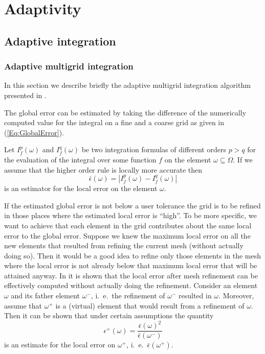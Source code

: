 \documentclass[11pt,a4paper,headinclude,footinclude,DIV16,headings=normal]{scrreprt}
\begin{document}
\chapter{Adaptivity}

\section{Adaptive integration}

\subsection{Adaptive multigrid integration}

In this section we describe briefly the adaptive multigrid integration
algorithm presented in \cite{Deuflhard93}.


The global error can be estimated by taking the difference of the numerically
computed value for the integral on a fine and a coarse grid as given in
(\ref{Eq:GlobalError}).


Let $I_f^p(\omega)$ and $I_f^q(\omega)$ be two integration formulas of
different orders $p>q$ for the evaluation of the integral over some
function $f$ on the element $\omega\subseteq\Omega$. If we assume that
the higher order rule is locally more accurate then
\begin{equation}
\bar{\epsilon}(\omega) = |I_f^p(\omega)-I_f^q(\omega)|
\end{equation}
is an estimator for the local error on the element $\omega$.


If the estimated global error is not below a user tolerance the grid
is to be refined in those places where the estimated local error is
``high''. To be more specific, we want to achieve that each element in
the grid contributes about the same local error to the global
error. Suppose we knew the maximum local error on all the new elements
that resulted from refining the current mesh (without actually doing
so). Then it would be a good idea to refine only those elements in the
mesh where the local error is not already below that maximum local
error that will be attained anyway.
In \cite{Deuflhard93} it is shown that the local error after mesh
refinement can be effectively computed without actually doing the
refinement. Consider an element $\omega$ and its father element
$\omega^-$, i.~e.~the refinement of  $\omega^-$ resulted in
$\omega$. Moreover, assume that $\omega^+$ is a (virtual) element that
would result from a refinement of $\omega$. Then it can be shown that
under certain assumptions the quantity
\begin{equation}
\epsilon^+(\omega) = \frac{\bar{\epsilon}(\omega)^2}{\bar{\epsilon}(\omega^-)}
\end{equation}
is an estimate for the local error on $\omega^+$,
i.~e.~$\bar{\epsilon}(\omega^+)$.
\end{document}
